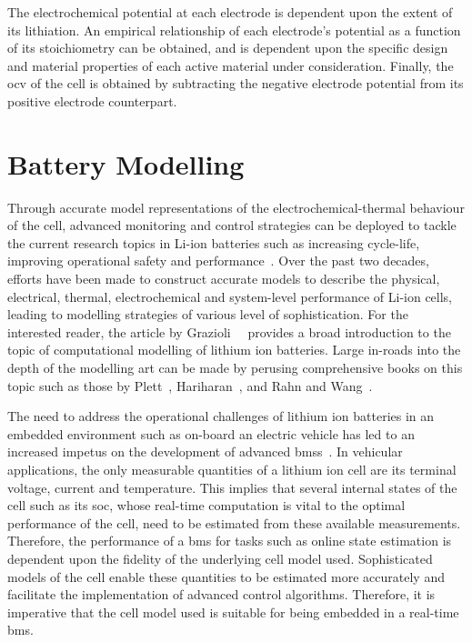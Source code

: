 The electrochemical potential at each electrode  is dependent upon the extent of
its  lithiation. An  empirical  relationship of  each  electrode's potential  as
a  function  of  its  stoichiometry  can be  obtained,  and  is  dependent  upon
the  specific design  and  material  properties of  each  active material  under
consideration. Finally, the \gls{ocv} of the cell is obtained by subtracting the
negative electrode potential from its positive electrode counterpart.


\section{Battery Modelling}

Through accurate model representations  of the electrochemical-thermal behaviour
of  the cell,  advanced monitoring  and control  strategies can  be deployed  to
tackle  the current  research  topics  in Li-ion  batteries  such as  increasing
cycle-life,  improving  operational   safety  and  performance~\cite{Plett2015}.
Over  the  past two  decades,  efforts  have  been  made to  construct  accurate
models  to  describe  the  physical, electrical,  thermal,  electrochemical  and
system-level performance  of Li-ion  cells, leading  to modelling  strategies of
various  level of  sophistication. For  the  interested reader,  the article  by
Grazioli~\etal~\cite{Grazioli2016a} provides  a broad introduction to  the topic
of computational  modelling of  lithium ion batteries.  Large in-roads  into the
depth of the modelling  art can be made by perusing  comprehensive books on this
topic such  as those by  Plett~\cite{Plett2015}, Hariharan~\cite{Hariharan2017},
and Rahn and Wang~\cite{Rahn2013}.

The  need  to  address  the  operational challenges  of  lithium  ion  batteries
in   an   embedded   environment   such  as   on-board   an   electric   vehicle
has   led   to  an   increased   impetus   on   the  development   of   advanced
\glspl{bms}~\cite{Bergveld2002}. In vehicular  applications, the only measurable
quantities  of  a  lithium  ion  cell are  its  terminal  voltage,  current  and
temperature. This implies  that several internal states of the  cell such as its
\gls{soc}, whose  real-time computation is  vital to the optimal  performance of
the cell, need to be estimated from these available measurements. Therefore, the
performance  of  a \gls{bms}  for  tasks  such  as  online state  estimation  is
dependent upon  the fidelity  of the underlying  cell model  used. Sophisticated
models of the  cell enable these quantities to be  estimated more accurately and
facilitate the implementation  of advanced control algorithms.  Therefore, it is
imperative  that  the cell  model  used  is suitable  for  being  embedded in  a
real-time \gls{bms}.

